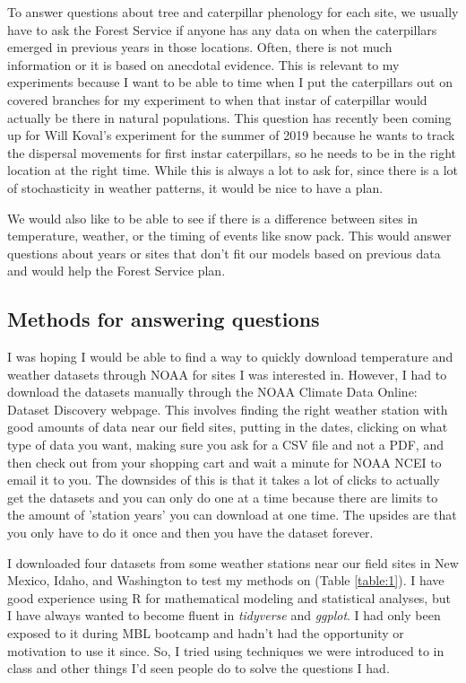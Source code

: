 \documentclass[12pt,letter]{article}
\begin{document}
To answer questions about tree and caterpillar phenology for each site, we usually have to ask the Forest Service if anyone has any data on when the caterpillars emerged in previous years in those locations. Often, there is not much information or it is based on anecdotal evidence. This is relevant to my experiments because I want to be able to time when I put the caterpillars out on covered branches for my experiment to when that instar of caterpillar would actually be there in natural populations. This question has recently been coming up for Will Koval's experiment for the summer of 2019 because he wants to track the dispersal movements for first instar caterpillars, so he needs to be in the right location at the right time. While this is always a lot to ask for, since there is a lot of stochasticity in weather patterns, it would be nice to have a plan.  

We would also like to be able to see if there is a difference between sites in temperature, weather, or the timing of events like snow pack. This would answer questions about years or sites that don't fit our models based on previous data and would help the Forest Service plan. 

\subsection*{Methods for answering questions}

I was hoping I would be able to find a way to quickly download temperature and weather datasets through NOAA for sites I was interested in. However, I had to download the datasets manually through the NOAA Climate Data Online: Dataset Discovery webpage. This involves finding the right weather station with good amounts of data near our field sites, putting in the dates, clicking on what type of data you want, making sure you ask for a CSV file and not a PDF, and then check out from your shopping cart and wait a minute for NOAA NCEI to email it to you. The downsides of this is that it takes a lot of clicks to actually get the datasets and you can only do one at a time because there are limits to the amount of 'station years' you can download at one time. The upsides are that you only have to do it once and then you have the dataset forever. 

I downloaded four datasets from some weather stations near our field sites in New Mexico, Idaho, and Washington to test my methods on (Table \ref{table:1}). I have good experience using R for mathematical modeling and statistical analyses, but I have always wanted to become fluent in \textit{tidyverse} and \textit{ggplot}. I had only been exposed to it during MBL bootcamp and hadn't had the opportunity or motivation to use it since. So, I tried using techniques we were introduced to in class and other things I'd seen people do to solve the questions I had. 
\end{document}
